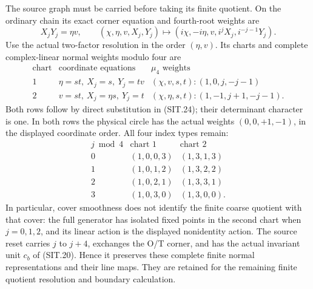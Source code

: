 The source graph must be carried before taking its finite quotient.
On the ordinary chain its exact corner equation and fourth-root
weights are
\[
 X_jY_j=\eta v,\qquad
 (\chi,\eta,v,X_j,Y_j)\longmapsto
 (i\chi,-i\eta,v,i^jX_j,i^{-j-1}Y_j).
 \tag{SIT.24}
\]
Use the actual two-factor resolution in the order \((\eta,v)\).
Its charts and complete complex-linear normal weights modulo four
are
\[
 \begin{array}{c|c|c}
 \text{chart}&\text{coordinate equations}&\mu_4\text{ weights}\\\hline
 1&\eta=st,\ X_j=s,\ Y_j=tv
       &(\chi,v,s,t):(1,0,j,-j-1)\\
 2&v=st,\ X_j=\eta s,\ Y_j=t
       &(\chi,\eta,s,t):(1,-1,j+1,-j-1).
 \end{array}
 \tag{SIT.25}
\]
Both rows follow by direct substitution in (SIT.24); their
determinant character is one. In both rows the physical circle
has the actual weights \((0,0,+1,-1)\), in the displayed
coordinate order. All four index types remain:
\[
 \begin{array}{c|c|c}
 j\bmod4&\text{chart 1}&\text{chart 2}\\\hline
 0&(1,0,0,3)&(1,3,1,3)\\
 1&(1,0,1,2)&(1,3,2,2)\\
 2&(1,0,2,1)&(1,3,3,1)\\
 3&(1,0,3,0)&(1,3,0,0).
 \end{array}
 \tag{SIT.26}
\]
In particular, cover smoothness does not identify the finite
coarse quotient with that cover: the full generator has isolated
fixed points in the second chart when \(j=0,1,2\), and its
linear action is the displayed nonidentity action. The source
reset carries \(j\) to \(j+4\), exchanges the O/T corner, and
has the actual invariant unit \(c_b\) of (SIT.20). Hence it
preserves these complete finite normal representations and
their line maps. They are retained for the remaining finite
quotient resolution and boundary calculation.

